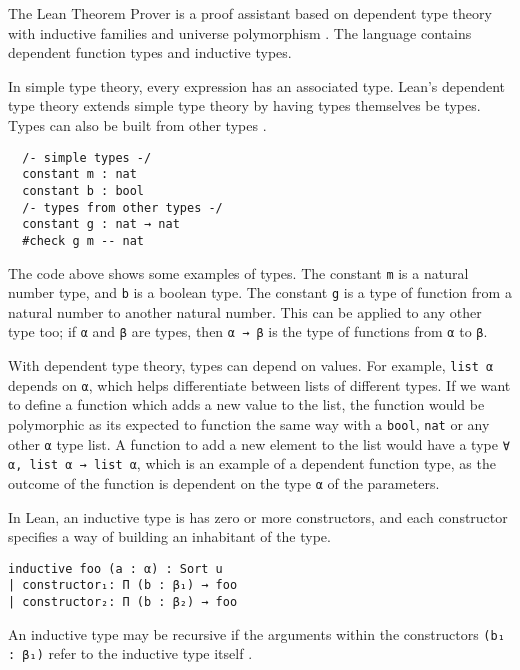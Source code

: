 The Lean Theorem Prover is a proof assistant based on dependent type theory with inductive families and universe polymorphism \cite{inductive_families}. The language contains dependent function types and inductive types.

In simple type theory, every expression has an associated type. Lean's dependent type theory extends simple type theory by having types themselves be types. Types can also be built from other types \cite{lean:manual}.  

\begin{lstlisting}
  /- simple types -/
  constant m : nat
  constant b : bool
  /- types from other types -/
  constant g : nat → nat
  #check g m -- nat
\end{lstlisting}

The code above shows some examples of types. The constant \lstinline{m} is a natural number type, and \lstinline{b} is a boolean type. The constant \lstinline{g} is a type of function from a natural number to another natural number. This can be applied to any other type too; if \lstinline{α} and \lstinline{β} are types, then \lstinline{α → β} is the type of functions from \lstinline{α} to \lstinline{β}.

With dependent type theory, types can depend on values. For example, \lstinline{list α} depends on \lstinline{α}, which helps differentiate between lists of different types. If we want to define a function which adds a new value to the list, the function would be polymorphic as its expected to function the same way with a \lstinline{bool}, \lstinline{nat} or any other \lstinline{α} type list. A function to add a new element to the list would have a type \lstinline{∀ α, list α → list α}, which is an example of a dependent function type, as the outcome of the function is dependent on the type \lstinline{α} of the parameters.

In Lean, an inductive type is has zero or more constructors, and each constructor specifies a way of building an inhabitant of the type. 

\begin{lstlisting}
inductive foo (a : α) : Sort u
| constructor₁: Π (b : β₁) → foo
| constructor₂: Π (b : β₂) → foo
\end{lstlisting}

An inductive type may be recursive if the arguments within the constructors \lstinline{(b₁ : β₁)} refer to the inductive type itself \cite{lean:reference}.
